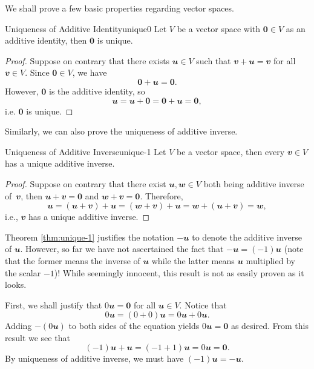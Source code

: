 \documentclass[math, code]{amznotes}
\theoremstyle{remark}
\newcommand{\zero}{\mathbf{0}}
\begin{document}
We shall prove a few basic properties regarding vector spaces.
\begin{thmbox}{Uniqueness of Additive Identity}{unique0}
    Let $V$ be a vector space with $\zero \in V$ as an additive identity, then $\zero$ is unique.
    \tcblower
    \begin{proof}
        Suppose on contrary that there exists $\mathbfit{u} \in V$ such that $\mathbfit{v + u = v}$ for all $\mathbfit{v} \in V$. Since $\zero \in V$, we have
        \begin{equation*}
            \zero + \mathbfit{u} = \zero.
        \end{equation*}
        However, $\zero$ is the additive identity, so 
        \begin{equation*}
            \mathbfit{u} = \mathbfit{u} + \zero = \zero + \mathbfit{u} = \zero,
        \end{equation*}
        i.e. $\zero$ is unique.
    \end{proof}
\end{thmbox}
Similarly, we can also prove the uniqueness of additive inverse.
\begin{thmbox}{Uniqueness of Additive Inverse}{unique-1}
    Let $V$ be a vector space, then every $\mathbfit{v} \in V$ has a unique additive inverse.
    \tcblower
    \begin{proof}
        Suppose on contrary that there exist $\mathbfit{u, w} \in V$ both being additive inverse of~$\mathbfit{v}$, then $\mathbfit{u + v} = \zero$ and $\mathbfit{w + v} = \zero$. Therefore,
        \begin{equation*}
            \mathbfit{u} = \mathbfit{(u + v) + u} = \mathbfit{(w + v) + u} = \mathbfit{w + (u + v)} = \mathbfit{w},
        \end{equation*}
        i.e., $\mathbfit{v}$ has a unique additive inverse.
    \end{proof}
\end{thmbox}
Theorem \ref{thm:unique-1} justifies the notation $-\mathbfit{u}$ to denote the additive inverse of $\mathbfit{u}$. However, so far we have not ascertained the fact that $-\mathbfit{u} = (-1)\mathbfit{u}$ (note that the former means the inverse of $\mathbfit{u}$ while the latter means $\mathbfit{u}$ multiplied by the scalar $-1$)! While seemingly innocent, this result is not as easily proven as it looks.

First, we shall justify that $0\mathbfit{u} = \zero$ for all $\mathbfit{u} \in V$. Notice that
\begin{equation*}
    0\mathbfit{u} = (0 + 0)\mathbfit{u} = 0\mathbfit{u} + 0\mathbfit{u}.
\end{equation*}
Adding $-(0\mathbfit{u})$ to both sides of the equation yields $0\mathbfit{u} = \zero$ as desired. From this result we see that
\begin{equation*}
    (-1)\mathbfit{u} + \mathbfit{u} = (-1 + 1)\mathbfit{u} = 0\mathbfit{u} = \zero.
\end{equation*}
By uniqueness of additive inverse, we must have $(-1)\mathbfit{u} = -\mathbfit{u}$.
\end{document}
